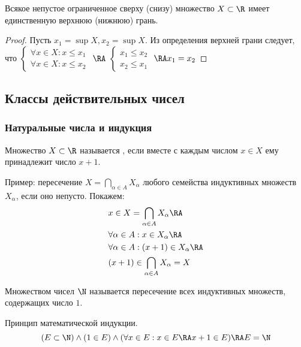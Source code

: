 \documentclass[a4paper, 14pt]{article}
\begin{document}
    \begin{lemma}
        Всякое непустое ограниченное сверху (снизу) множество $X \subset \R$ имеет единственную верхнюю (нижнюю) грань.
    \end{lemma}
    \begin{proof}
        Пусть $x_1 = \sup X, x_2 = \sup X$. Из определения верхней грани следует, что
        $\begin{cases}
            \forall x \in X : x \leq x_1 \\
            \forall x \in X : x \leq x_2
        \end{cases}$ $\RA$
        $\begin{cases}
            x_1 \leq x_2 \\
            x_2 \leq x_1
        \end{cases}$ $\RA x_1 = x_2$  
    \end{proof}


    \subsection{Классы действительных чисел}
    \subsubsection*{Натуральные числа и индукция}
    \begin{definition}
        Множество $X \subset \R$ называется {}, если вместе
        с каждым числом $x \in X$ ему принадлежит число $x+1$.
    \end{definition}
    Пример: пересечение $X = \bigcap_{\alpha \in A} X_\alpha$ любого
    семейства индуктивных множеств $X_\alpha$, если оно непусто. Покажем:
    \begin{align*}
        &x \in X = \bigcap_{\alpha \in A} X_\alpha \RA\\
        &\forall \alpha \in A : x \in X_\alpha \RA \\
        &\forall \alpha \in A : (x+1) \in X_\alpha \RA \\
        &(x+1) \in \bigcap_{\alpha \in A} X_\alpha = X
    \end{align*}

    \begin{definition}
        Множеством { чисел} $\N$ называется пересечение всех
        индуктивных множеств, содержащих число $1$.
    \end{definition} 

    \begin{lemma} Принцип математической индукции.
        \[(E \subset \N) \land (1 \in E) \land (\forall x \in E : x \in E \RA x+1 \in E) \RA E = \N\]
    \end{lemma}
\end{document}
